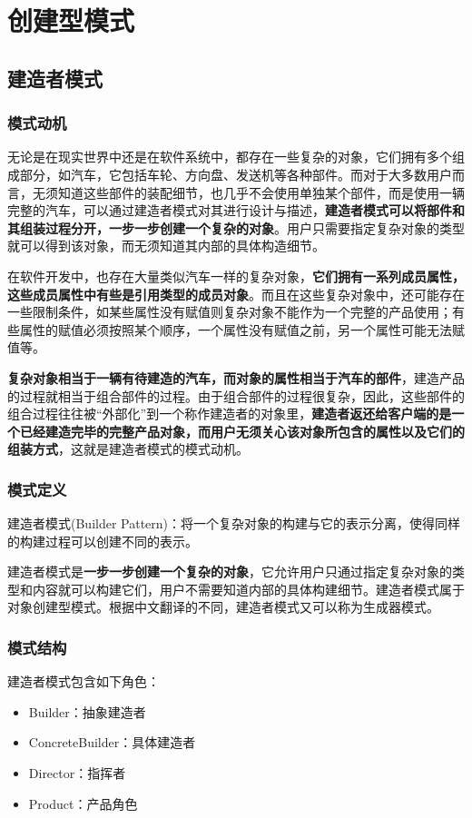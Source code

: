 \section{创建型模式}

\subsection{建造者模式}

\subsubsection{模式动机}
无论是在现实世界中还是在软件系统中，都存在一些复杂的对象，它们拥有多个组成部分，如汽车，它包括车轮、方向盘、发送机等各种部件。而对于大多数用户而言，无须知道这些部件的装配细节，也几乎不会使用单独某个部件，而是使用一辆完整的汽车，可以通过建造者模式对其进行设计与描述，\textbf{建造者模式可以将部件和其组装过程分开，一步一步创建一个复杂的对象}。用户只需要指定复杂对象的类型就可以得到该对象，而无须知道其内部的具体构造细节。

在软件开发中，也存在大量类似汽车一样的复杂对象，\textbf{它们拥有一系列成员属性，这些成员属性中有些是引用类型的成员对象}。而且在这些复杂对象中，还可能存在一些限制条件，如某些属性没有赋值则复杂对象不能作为一个完整的产品使用；有些属性的赋值必须按照某个顺序，一个属性没有赋值之前，另一个属性可能无法赋值等。

\textbf{复杂对象相当于一辆有待建造的汽车，而对象的属性相当于汽车的部件}，建造产品的过程就相当于组合部件的过程。由于组合部件的过程很复杂，因此，这些部件的组合过程往往被“外部化”到一个称作建造者的对象里，\textbf{建造者返还给客户端的是一个已经建造完毕的完整产品对象，而用户无须关心该对象所包含的属性以及它们的组装方式}，这就是建造者模式的模式动机。

\subsubsection{模式定义}
建造者模式(Builder Pattern)：将一个复杂对象的构建与它的表示分离，使得同样的构建过程可以创建不同的表示。

建造者模式是\textbf{一步一步创建一个复杂的对象}，它允许用户只通过指定复杂对象的类型和内容就可以构建它们，用户不需要知道内部的具体构建细节。建造者模式属于对象创建型模式。根据中文翻译的不同，建造者模式又可以称为生成器模式。

\subsubsection{模式结构}
建造者模式包含如下角色：
\vspace{-0.8em}
\begin{multicols}{2}
    \begin{itemize}
        \item Builder：抽象建造者
        \item ConcreteBuilder：具体建造者
        \item Director：指挥者
        \item Product：产品角色
    \end{itemize}
\end{multicols}
\vspace{-1em}

